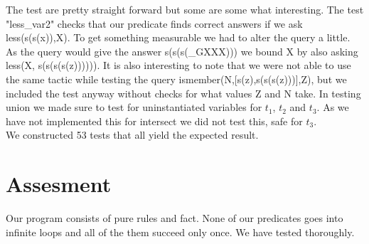 \documentclass[]{article}
\begin{document}
The test are pretty straight forward but some are some what interesting. The test "less\_var2" checks that our predicate finds correct answers if we ask less(s(s(x)),X). To get something measurable we had to alter the query a little. As the query would give the answer s(s(s(\_GXXX))) we bound X by also asking less(X, s(s(s(s(z)))))). It is also interesting to note that we were not able to use the same tactic while testing the query ismember(N,[s(z),s(s(s(z)))],Z), but we included the test anyway without checks for what values Z and N take. In testing union we made sure to test for uninstantiated variables for $t_1$, $t_2$ and $t_3$. As we have not implemented this for intersect we did not test this, safe for $t_3$.\\
We constructed 53 tests that all yield the expected result.

\section{Assesment} %
\label{sec:assesment}
Our program consists of pure rules and fact. None of our predicates goes into infinite loops and all of the them succeed only once.
We have tested thoroughly.



\end{document}
